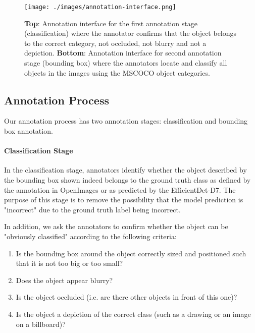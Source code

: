 \documentclass[final]{cvpr}
\begin{document}
\begin{figure}[t]
\begin{center}
\texttt{[image: ./images/annotation-interface.png]}
\end{center}
    \caption{\textbf{Top}: Annotation interface for the first annotation stage (classification) where the annotator confirms that the object belongs to the correct category, not occluded, not blurry and not a depiction.
    \textbf{Bottom}: Annotation interface for second annotation stage (bounding box) where the annotators locate and classify all objects in the images using the MSCOCO object categories.}
\label{fig:long}
\label{fig:onecol}
\label{fig:annotation_interface}
\end{figure}


\subsection{Annotation Process}

Our annotation process has two annotation stages: classification and bounding box annotation.

\paragraph{Classification Stage}
In the classification stage, annotators identify whether the object described by the bounding box shown indeed belongs to the ground truth class as defined by the annotation in OpenImages or as predicted by the EfficientDet-D7.
The purpose of this stage is to remove the possibility that the model prediction is "incorrect" due to the ground truth label being incorrect.

In addition, we ask the annotators to confirm whether the object can be "obviously classified" according to the following criteria: 

\begin{enumerate}
    \item Is the bounding box around the object correctly sized and positioned such that it is not too big or too small? 
    \item Does the object appear blurry? 
    \item Is the object occluded (i.e. are there other objects in front of this one)?
    \item Is the object a depiction of the correct class (such as a drawing or an image on a billboard)?
\end{enumerate}
\end{document}
